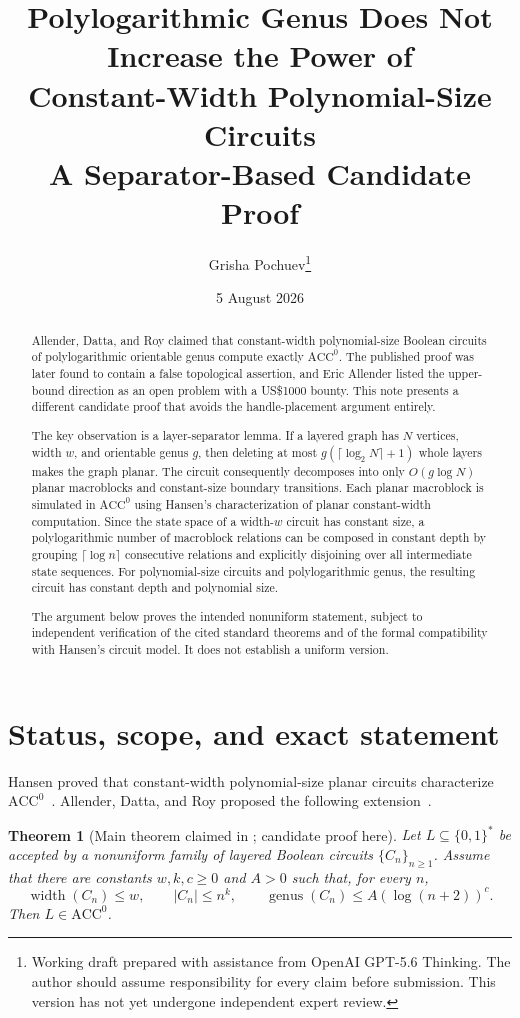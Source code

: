\documentclass[11pt]{article}
\title{Polylogarithmic Genus Does Not Increase the Power of\\
Constant-Width Polynomial-Size Circuits\\
\large A Separator-Based Candidate Proof}
\author{Grisha Pochuev\thanks{Working draft prepared with assistance from OpenAI GPT-5.6 Thinking. The author should assume responsibility for every claim before submission. This version has not yet undergone independent expert review.}}
\date{5 August 2026}
\newtheorem{theorem}{Theorem}[section]
\theoremstyle{definition}
\newcommand{\ACC}{\mathrm{ACC}^{0}}
\newcommand{\genus}{\operatorname{genus}}
\newcommand{\bits}{\{0,1\}}
\begin{document}
\maketitle

\begin{abstract}
Allender, Datta, and Roy claimed that constant-width polynomial-size Boolean circuits of polylogarithmic orientable genus compute exactly $\ACC$. The published proof was later found to contain a false topological assertion, and Eric Allender listed the upper-bound direction as an open problem with a US\$1000 bounty. This note presents a different candidate proof that avoids the handle-placement argument entirely.

The key observation is a layer-separator lemma. If a layered graph has $N$ vertices, width $w$, and orientable genus $g$, then deleting at most $g(\lceil\log_2 N\rceil+1)$ whole layers makes the graph planar. The circuit consequently decomposes into only $O(g\log N)$ planar macroblocks and constant-size boundary transitions. Each planar macroblock is simulated in $\ACC$ using Hansen's characterization of planar constant-width computation. Since the state space of a width-$w$ circuit has constant size, a polylogarithmic number of macroblock relations can be composed in constant depth by grouping $\lceil\log n\rceil$ consecutive relations and explicitly disjoining over all intermediate state sequences. For polynomial-size circuits and polylogarithmic genus, the resulting circuit has constant depth and polynomial size.

The argument below proves the intended nonuniform statement, subject to independent verification of the cited standard theorems and of the formal compatibility with Hansen's circuit model. It does not establish a uniform version.
\end{abstract}

\tableofcontents

\section{Status, scope, and exact statement}

Hansen proved that constant-width polynomial-size planar circuits characterize $\ACC$~\cite{Hansen2006}. Allender, Datta, and Roy proposed the following extension~\cite{ADR2005,ECCC2004}.

\begin{theorem}[Main theorem claimed in \cite{ADR2005}; candidate proof here]\label{thm:main}
Let $L\subseteq\bits^*$ be accepted by a nonuniform family of layered Boolean circuits $\{C_n\}_{n\ge 1}$. Assume that there are constants $w,k,c\ge 0$ and $A>0$ such that, for every $n$,
\[
  \operatorname{width}(C_n)\le w,\qquad
  |C_n|\le n^k,\qquad
  \genus(C_n)\le A(\log(n+2))^c.
\]
Then $L\in\ACC$.
\end{theorem}
\end{document}
